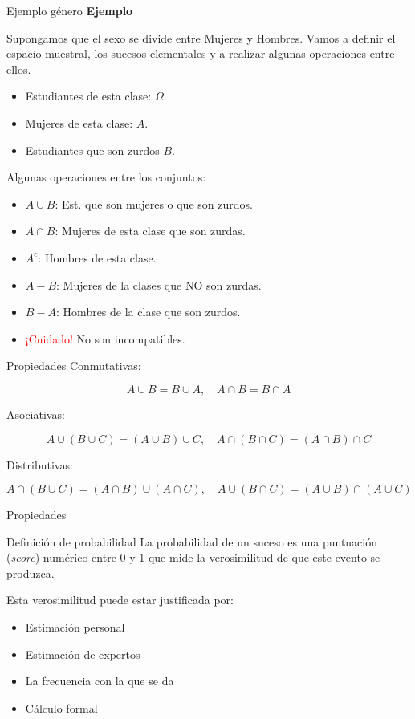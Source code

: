\documentclass[
  ignorenonframetext,
  aspectratio=169]{beamer}
\providecommand{\tightlist}{%
  \setlength{\itemsep}{0pt}\setlength{\parskip}{0pt}}\usepackage{longtable,booktabs,array}
\newcommand\red[1]{\textcolor{red}{#1}}
\begin{document}
\begin{frame}{Ejemplo género}
\label{ejemplo-guxe9nero}
\textbf{Ejemplo}

Supongamos que el sexo se divide entre Mujeres y Hombres. Vamos a
definir el espacio muestral, los sucesos elementales y a realizar
algunas operaciones entre ellos.

\begin{itemize}
\tightlist
\item
  Estudiantes de esta clase: \(\Omega\).
\item
  Mujeres de esta clase: \(A\).
\item
  Estudiantes que son zurdos \(B\).
\end{itemize}

Algunas operaciones entre los conjuntos:

\begin{itemize}
\tightlist
\item
  \(A\cup B\): Est. que son mujeres o que son zurdos.
\item
  \(A\cap B\): Mujeres de esta clase que son zurdas.
\item
  \(A^c\): Hombres de esta clase.
\item
  \(A-B\): Mujeres de la clases que NO son zurdas.
\item
  \(B-A\): Hombres de la clase que son zurdos.
\item
  \red{¡Cuidado!} No son incompatibles.
\end{itemize}
\end{frame}

\begin{frame}{Propiedades}
\label{propiedades}
Conmutativas:

\[A\cup B=B\cup A, \quad A\cap B=B\cap A\]

Asociativas:

\[A\cup(B\cup C)=(A\cup B)\cup C, \quad A\cap(B\cap C)=(A\cap B)\cap C\]

Distributivas:

\[A\cap(B\cup C)=(A\cap B)\cup (A\cap C), \quad A\cup(B\cap C)=(A\cup B)\cap (A\cup C)\]
\end{frame}

\begin{frame}{Propiedades}
\label{propiedades-1}
\end{frame}

\begin{frame}{Definición de probabilidad}
\label{definiciuxf3n-de-probabilidad}
La probabilidad de un suceso es una puntuación (\emph{score}) numérico
entre 0 y 1 que mide la verosimilitud de que este evento se produzca.

Esta verosimilitud puede estar justificada por:

\begin{itemize}
\item
  Estimación personal
\item
  Estimación de expertos
\item
  La frecuencia con la que se da
\item
  Cálculo formal
\end{itemize}
\end{frame}
\end{document}
